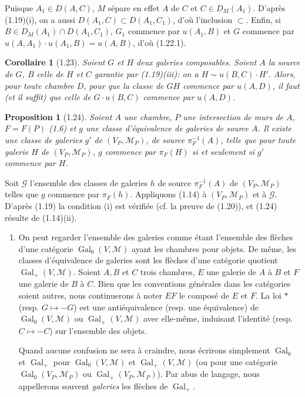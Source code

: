 \documentclass[12pt]{article}
\newtheorem{proposition}[theoreme]{Proposition}
\newtheorem{corollaire}[theoreme]{Corollaire}
\theoremstyle{remark}
\DeclareMathOperator{\Gal}{Gal}
\begin{document}
Puisque $A_1 \in D(A, C)$, $M$ sépare en effet $A$ de $C$ et $C \in D_M(A_1)$. D'après (1.19)(i), on a aussi $D(A_1, C) \subset D(A_1, C_1)$, d'où l'inclusion $\subset$. Enfin, si $B \in D_M(A_1) \cap D(A_1, C_1)$, $G_1$ commence par $u(A_1, B)$ et $G$ commence par $u(A, A_1) \cdot u(A_1, B) = u(A, B)$, d'où (1.22.1).

\begin{corollaire}[1.23]
Soient $G$ et $H$ deux galeries composables. Soient $A$ la source de $G$, $B$ celle de $H$ et $C$ garantie par (1.19)(iii): on a $H \sim u(B, C) \cdot H'$. Alors, pour toute chambre $D$, pour que la classe de $GH$ commence par $u(A, D)$, il faut (et il suffit) que celle de $G \cdot u(B, C)$ commence par $u(A, D)$.
\end{corollaire}

\begin{proposition}[1.24]
Soient $A$ une chambre, $P$ une intersection de murs de $A$, $F = F(P)$ (1.6) et $g$ une classe d'équivalence de galeries de source $A$. Il existe une classe de galeries $g'$ de $(V_P, \mathcal{M}_P)$, de source $\pi_F^{-1}(A)$, telle que pour toute galerie $H$ de $(V_P, \mathcal{M}_P)$, $g$ commence par $\pi_F(H)$ si et seulement si $g'$ commence par $H$.
\end{proposition}

Soit $\mathscr{G}$ l'ensemble des classes de galeries $h$ de source $\pi_F^{-1}(A)$ de $(V_P, \mathcal{M}_P)$ telles que $g$ commence par $\pi_F(h)$. Appliquons (1.14) à $(V_P, \mathcal{M}_P)$ et à $\mathscr{G}$. D'après (1.19) la condition (i) est vérifiée (cf. la preuve de (1.20)), et (1.24) résulte de (1.14)(ii).

\begin{enumerate}
\item[(1.25)] On peut regarder l'ensemble des galeries comme étant l'ensemble des flèches d'une catégorie $\Gal_0(V, \mathcal{M})$ ayant les chambres pour objets. De même, les classes d'équivalence de galeries sont les flèches d'une catégorie quotient $\Gal_+(V, \mathcal{M})$. Soient $A, B$ et $C$ trois chambres, $E$ une galerie de $A$ à $B$ et $F$ une galerie de $B$ à $C$. Bien que les conventions générales dans les catégories soient autres, nous continuerons à noter $EF$ le composé de $E$ et $F$. La loi $*$ (resp. $G \mapsto -G$) est une antiéquivalence (resp. une équivalence) de $\Gal_0(V, \mathcal{M})$ ou $\Gal_+(V, \mathcal{M})$ avec elle-même, induisant l'identité (resp. $C \mapsto -C$) sur l'ensemble des objets.

Quand aucune confusion ne sera à craindre, nous écrirons simplement $\Gal_0$ et $\Gal_+$ pour $\Gal_0(V, \mathcal{M})$ et $\Gal_+(V, \mathcal{M})$ (ou pour une catégorie $\Gal_0(V_P, \mathcal{M}_P)$ ou $\Gal_+(V_P, \mathcal{M}_P)$). Par abus de langage, nous appellerons souvent \emph{galeries} les flèches de $\Gal_+$.
\end{enumerate}
\end{document}
